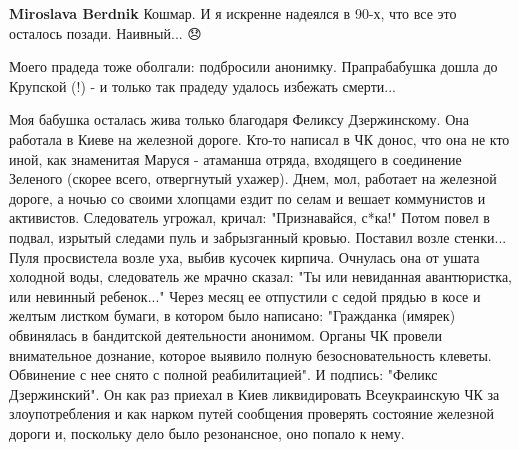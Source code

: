 \begin{itemize}
\begin{itemize}
\textbf{Miroslava Berdnik} Кошмар. И я искренне надеялся в 90-х, что все это осталось позади. Наивный... 😞
\end{itemize}

 
Моего прадеда тоже оболгали: подбросили анонимку. Прапрабабушка дошла до
Крупской (!) - и только так прадеду удалось избежать смерти...

\begin{itemize}
 

Моя бабушка осталась жива только благодаря Феликсу Дзержинскому. Она работала в
Киеве на железной дороге. Кто-то написал в ЧК донос, что она не кто иной, как
знаменитая Маруся - атаманша отряда, входящего в соединение Зеленого (скорее
всего, отвергнутый ухажер). Днем, мол, работает на железной дороге, а ночью со
своими хлопцами ездит по селам и вешает коммунистов и активистов. Следователь
угрожал, кричал: "Признавайся, с*ка!" Потом повел в подвал, изрытый следами
пуль и забрызганный кровью. Поставил возле стенки... Пуля просвистела возле
уха, выбив кусочек кирпича. Очнулась она от ушата холодной воды, следователь же
мрачно сказал: "Ты или невиданная авантюристка, или невинный ребенок..." Через
месяц ее отпустили с седой прядью в косе и желтым листком бумаги, в котором
было написано: "Гражданка (имярек) обвинялась в бандитской деятельности
анонимом. Органы ЧК провели внимательное дознание, которое выявило полную
безосновательность клеветы. Обвинение с нее снято с полной реабилитацией". И
подпись: "Феликс Дзержинский". Он как раз приехал в Киев ликвидировать
Всеукраинскую ЧК за злоупотребления и как нарком путей сообщения проверять
состояние железной дороги и, поскольку дело было резонансное, оно попало к
нему.

\end{itemize}

 


\end{itemize}
